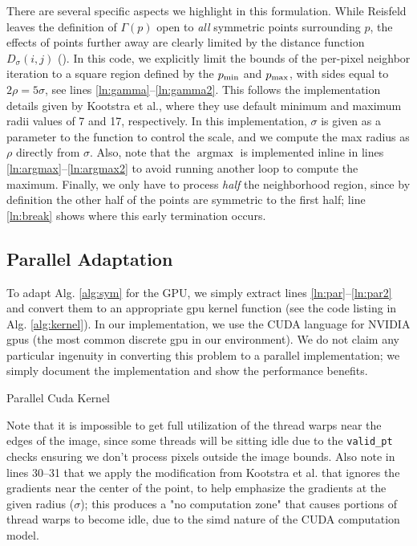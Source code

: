 \pagebreak
There are several specific aspects we highlight in this formulation. While Reisfeld leaves the definition of \(\Gamma(p)\) open to \emph{all} symmetric points surrounding \(p\), the effects of points further away are clearly limited by the distance function \(D_\sigma(i,j)\) (\ie {}). In this code, we explicitly limit the bounds of the per-pixel neighbor iteration to a square region defined by the \(p_{\min}\) and \(p_{\max}\), with sides equal to \(2\rho = 5\sigma\), see lines \ref{ln:gamma}--\ref{ln:gamma2}. This follows the implementation details given by Kootstra et al.\cite{kootstra_using_2010}, where they use default minimum and maximum radii values of 7 and 17, respectively. In this implementation, \(\sigma\) is given as a parameter to the function to control the scale, and we compute the max radius as \(\rho\) directly from \(\sigma\). Also, note that the \(\operatorname{argmax}\) is implemented inline in lines \ref{ln:argmax}--\ref{ln:argmax2} to avoid running another loop to compute the maximum. Finally, we only have to process \emph{half} the neighborhood region, since by definition the other half of the points are symmetric to the first half; line \ref{ln:break} shows where this early termination occurs. 


\subsection{Parallel Adaptation}
\label{sec:parallel}

To adapt Alg. \ref{alg:sym} for the GPU, we simply extract lines \ref{ln:par}--\ref{ln:par2} and convert them to an appropriate \gls{gpu} kernel function (see the code listing in Alg. \ref{alg:kernel}). In our implementation, we use the CUDA language for NVIDIA \glspl{gpu} (the most common discrete \gls{gpu} in our environment). We do not claim any particular ingenuity in converting this problem to a parallel implementation; we simply document the implementation and show the performance benefits. 

\Needspace{0.8\textheight}
\begin{algorithm}[!htp]
\caption{Parallel Cuda Kernel}\label{alg:kernel}

\end{algorithm}

Note that it is impossible to get full utilization of the thread warps near the edges of the image, since some threads will be sitting idle due to the \texttt{valid\_pt} checks ensuring we don't process pixels outside the image bounds. Also note in lines 30--31 that we apply the modification from Kootstra et al.\cite{kootstra_using_2010} that ignores the gradients near the center of the point, to help emphasize the gradients at the given radius (\(\sigma\)); this produces a "no computation zone" that causes portions of thread warps to become idle, due to the \gls{simd} nature of the CUDA computation model.

